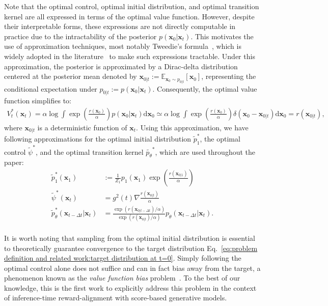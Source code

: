 Note that the optimal control, optimal initial distribution, and optimal transition kernel are all expressed in terms of the optimal value function. 
However, despite their interpretable forms, these expressions are not directly computable in practice due to the intractability of the posterior $p(\mathbf{x}_0|\mathbf{x}_t)$.
This motivates the use of approximation techniques, most notably Tweedie’s formula~\cite{efron2011tweedie}, which is widely adopted in the literature~\cite{chung2023dps, ye2024tfg, wu2023tds, kim2025DAS} to make such expressions tractable. 
Under this approximation, the posterior is approximated by a Dirac-delta distribution centered at the posterior mean denoted by $\mathbf{x}_{0|t}:=\mathbb{E}_{\mathbf{x}_0\sim p_{0|t}}[\mathbf{x}_0]$, representing the conditional expectation under $p_{0|t}:=p(\mathbf{x}_0|\mathbf{x}_t)$. 
Consequently, the optimal value function simplifies to:
\begin{align}
     V_t^*(\mathbf{x}_t)=\alpha \log \int \exp \left( \frac{r(\mathbf{x}_0)}{\alpha}\right)p(\mathbf{x}_0|\mathbf{x}_t)\mathrm{d}\mathbf{x}_0 \simeq \alpha \log \int \exp \left( \frac{r(\mathbf{x}_0)}{\alpha}\right)\delta(\mathbf{x}_0-\mathbf{x}_{0|t}) \mathrm{d}\mathbf{x}_0=r(\mathbf{x}_{0|t}),
\end{align}
where $\mathbf{x}_{0|t}$ is a deterministic function of $\mathbf{x}_t$. 
Using this approximation, we have following approximations for the optimal initial distribution $\tilde{p}_1^*$, the optimal control $\tilde{\psi}^*$, and the optimal transition kernel $\tilde{p_\theta}^*$, which are used throughout the paper:
\begin{align}
    \label{eq:SOC:approx optimal initial distribution}
    \tilde{p}_1^*(\mathbf{x}_1)&:=\frac{1}{Z_1}p_1(\mathbf{x}_1)\exp\left(\frac{r(\mathbf{x}_{0|1})}{\alpha} \right)\\
    \label{eq:SOC:approx optimal control}
    \tilde{\psi}^*(\mathbf{x}_t)&=g^2(t)\nabla \frac{r(\mathbf{x}_{0|t})}{\alpha}\\
    \label{eq:SOC:approx optimal transition kernel}
    \tilde{p}_{\theta}^*(\mathbf{x}_{t-\Delta t}|\mathbf{x}_{t})&=\frac{\exp (r(\mathbf{x}_{0|t-\Delta t})/\alpha)}{\exp (r(\mathbf{x}_{0|t})/\alpha)}p_\theta(\mathbf{x}_{t-\Delta t}|\mathbf{x}_{t}).
\end{align}\\
It is worth noting that sampling from the optimal initial distribution is essential to theoretically guarantee convergence to the target distribution Eq.~\ref{eq:problem definition and related work:target distribution at t=0}. Simply following the optimal control alone does not suffice and can in fact bias away from the target, a phenomenon known as the \textit{value function bias} problem~\cite{domingo-enrich2025adjoint}. 
To the best of our knowledge, this is the first work to explicitly address this problem in the context of inference-time reward-alignment with score-based generative models.